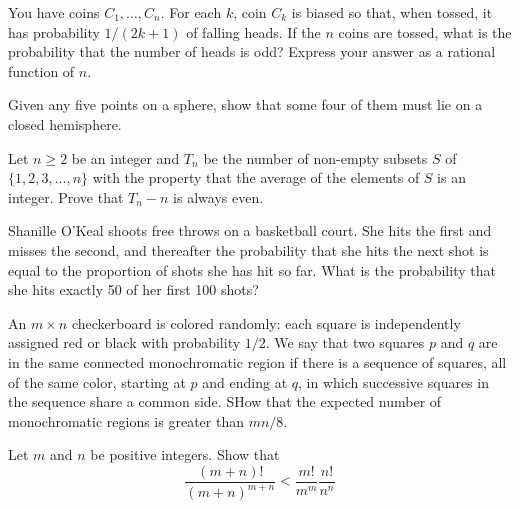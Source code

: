 \documentclass[12pt]{article}
\begin{document}
    \begin{exercise}[2001 A2]
        You have coins \(C_1,\ldots,C_n\).
        For each \(k\), coin \(C_k\) is biased so that, when tossed, it has probability \(1/(2k+1)\) of falling heads.
        If the \(n\) coins are tossed, what is the probability that the number of heads is odd?
        Express your answer as a rational function of \(n\).
    \end{exercise}

    \begin{exercise}[2002 A2]
        Given any five points on a sphere, show that some four of them must lie on a closed hemisphere.
    \end{exercise}

    \begin{exercise}[2002 A3]
        Let $n\geqslant 2$ be an integer and $T_n$ be the number of non-empty subsets $S$ of $\{1, 2, 3, \dots, n\}$ with the property that the average of the elements of $S$ is an integer. Prove that $T_n - n$ is always even.
    \end{exercise}

    \begin{exercise}[2002 B1]
        Shanille O'Keal shoots free throws on a basketball court.
        She hits the first and misses the second, and thereafter the probability that she hits the next shot is equal to the proportion of shots she has hit so far.
        What is the probability that she hits exactly 50 of her first 100 shots?
    \end{exercise}

    \begin{exercise}[2004 A5]
        An \(m\times n\) checkerboard is colored randomly: each square is independently assigned red or black with probability \(1/2\).
        We say that two squares \(p\) and \(q\) are in the same connected monochromatic region if there is a sequence of squares, all of the same color, starting at \(p\) and ending at \(q\), in which successive squares in the sequence share a common side.
        SHow that the expected number of monochromatic regions is greater than \(mn/8\).
    \end{exercise}

    \begin{exercise}[2004 B2]
        Let \(m\) and \(n\) be positive integers.
        Show that
        \[\frac{(m+n)!}{(m+n)^{m+n}}<\frac{m!}{m^m}\frac{n!}{n^n}\]
    \end{exercise}
\end{document}
